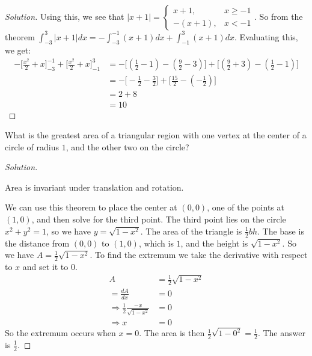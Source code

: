\documentclass[crop=false,class=book]{standalone}
\begin{document}
        \begin{proof}[Solution]
            Using this, we see that
            $|x+1|=\begin{cases}%
                x+1,&x\geq -1\\%
                -(x+1),&x< -1%
            \end{cases}$.
            So from the theorem
            $\int_{-3}^{3}|x+1|dx=%
            -\int_{-3}^{-1}(x+1)dx+\int_{-1}^{3}(x+1)dx$.
            Evaluating this, we get:
            \begin{align*}
                -\bigg[\frac{x^2}{2}+x\bigg]_{-3}^{-1}
                +\bigg[\frac{x^2}{2}+x\bigg]_{-1}^{3}
                &=-\bigg[(\frac{1}{2}-1)-(\frac{9}{2}-3)\bigg]
                +\bigg[(\frac{9}{2}+3)-(\frac{1}{2}-1)\bigg]\\
                &=-\bigg[-\frac{1}{2}-\frac{3}{2}\bigg]
                +\bigg[\frac{15}{2}-(-\frac{1}{2})\bigg]\\
                &=2+8\\ 
                &=10
            \end{align*}
        \end{proof}
        \begin{problem}
        What is the greatest area of a triangular region with one vertex at the center of a circle of radius $1$, and the other two on the circle?
        \end{problem}
        \begin{proof}[Solution]
        \begin{theorem*}
        Area is invariant under translation and rotation.
        \end{theorem*}
        We can use this theorem to place the center at $(0,0)$, one of the points at $(1,0)$, and then solve for the third point. The third point lies on the circle $x^2+y^2 = 1$, so we have $y = \sqrt{1-x^2}$. The area of the triangle is $\frac{1}{2}bh$. The base is the distance from $(0,0)$ to $(1,0)$, which is $1$, and the height is $\sqrt{1-x^2}$. So we have $A = \frac{1}{2}\sqrt{1-x^2}$. To find the extremum we take the derivative with respect to $x$ and set it to $0$.
        \begin{align*}
            A&=\frac{1}{2}\sqrt{1-x^{2}}\\
            =\frac{dA}{dx}&=0\\
            \Rightarrow\frac{1}{2}\frac{-x}{\sqrt{1-x^{2}}}&=0\\
            \Rightarrow x&=0
        \end{align*}
        So the extremum occurs when $x=0$. The area is then $\frac{1}{2}\sqrt{1-0^2} = \frac{1}{2}$. The answer is $\frac{1}{2}$.
        \end{proof}
\end{document}
